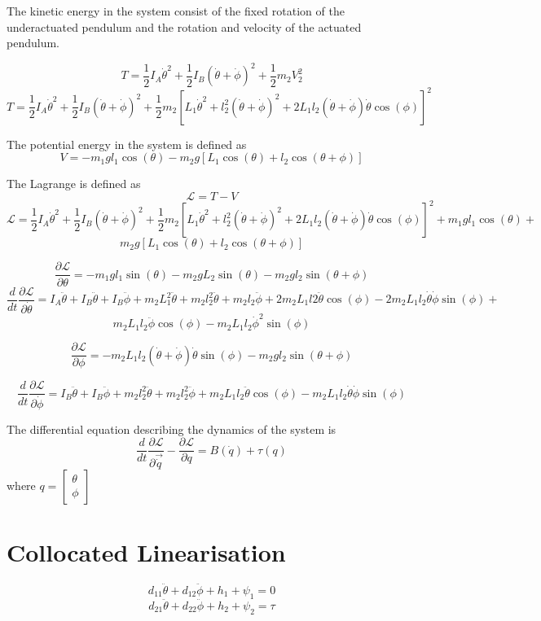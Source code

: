 The kinetic energy in the system consist of the fixed rotation of the underactuated  pendulum and the rotation and velocity of the actuated pendulum.

$$ T = \frac{1}{2}I_{A}\dot{\theta}^2 + \frac{1}{2}I_{B}(\dot{\theta}+\dot{\phi})^2 + \frac{1}{2}m_{2}V_{2}^2$$
$$ T = \frac{1}{2}I_{A}\dot{\theta}^2 + \frac{1}{2}I_{B}(\dot{\theta}+\dot{\phi})^2 + \frac{1}{2}m_{2}[L_{1}\dot{\theta}^2+l_{2}^2(\dot{\theta}+\dot{\phi})^2 + 
2L_{1}l_{2}(\dot{\theta}+\dot{\phi})\dot{\theta}\cos(\phi)]^2$$

The potential energy in the system is defined as
$$V=-m_{1}gl_{1}\cos(\theta)-m_{2}g[L_{1}\cos(\theta)+l_{2}\cos(\theta+\phi)]$$

The Lagrange is defined as 
$$\mathcal{L}=T-V$$
$$\mathcal{L} = \frac{1}{2}I_{A}\dot{\theta}^2 + \frac{1}{2}I_{B}(\dot{\theta}+\dot{\phi})^2 + \frac{1}{2}m_{2}[L_{1}\dot{\theta}^2+l_{2}^2(\dot{\theta}+\dot{\phi})^2 + 
2L_{1}l_{2}(\dot{\theta}+\dot{\phi})\dot{\theta}\cos(\phi)]^2+m_{1}gl_{1}\cos(\theta)+$$
$$m_{2}g[L_{1}\cos(\theta)+l_{2}\cos(\theta+\phi)]$$

$$\frac{\partial\mathcal{L}}{\partial\theta} = -m_{1}gl_{1}\sin(\theta)-m_{2}gL_{2}\sin(\theta)-m_{2}gl_{2}\sin(\theta+\phi)$$
$$\frac{d}{dt}\frac{\partial\mathcal{L}}{\partial\dot{\theta}} = I_{A}\ddot{\theta}+I_{B}\ddot{\theta}+I_{B}\ddot{\phi}+m_{2}L_{1}^2\ddot{\theta}+m_{2}l_{2}^2\ddot{\theta}+m_{2}l_{2}\ddot{\phi}+2m_{2}L_{1}l{2}\ddot{\theta}\cos(\phi)-2m_{2}L_{1}l_{2}\dot{\theta}\dot{\phi}\sin(\phi)+$$
$$m_{2}L_{1}l_{2}\ddot{\phi}\cos(\phi)-m_{2}L_{1}l_{2}\dot{\phi}^2\sin(\phi)$$


$$\frac{\partial\mathcal{L}}{\partial\phi} = -m_{2}L_{1}l_{2}(\dot{\theta}+\dot{\phi})\dot{\theta}\sin(\phi)-m_{2}gl_{2}\sin(\theta+\phi)$$

$$\frac{d}{dt}\frac{\partial\mathcal{L}}{\partial\dot{\phi}}=I_{B}\ddot{\theta}+I_{B}\ddot{\phi}+m_{2}l_{2}^2\ddot{\theta}+m_{2}l_{2}^2\ddot{\phi}+m_{2}L_{1}l_{2}\ddot{\theta}\cos(\phi)-m_{2}L_{1}l_{2}\dot{\theta}\dot{\phi}\sin(\phi)$$

The differential equation describing the dynamics of the system is
$$\frac{d}{dt}\frac{\partial\mathcal{L}}{\partial\vec{\dot{q}}}-\frac{\partial\mathcal{L}}{\partial q} = B(\dot{q})+\tau(q)$$ 
where  $ q = 
\begin{bmatrix}
\theta \\
\phi
\end{bmatrix}
$
\section{Collocated Linearisation}
\begin{equation} \label{app:eq:condense1}
d_{11}\ddot{\theta}+d_{12}\ddot{\phi} + h_{1} + \psi_{1} = 0
\end{equation}
\begin{equation} \label{app:eq:condense2}
d_{21}\ddot{\theta} + d_{22}\ddot{\phi} + h_{2} + \psi_{2} = \tau
\end{equation}

